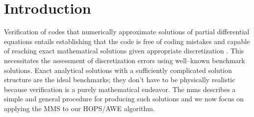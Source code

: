 \section{Introduction}
\label{intro:chapter 5 introduction}

Verification of codes that numerically approximate solutions of partial differential equations entails establishing that the code is free of coding mistakes and capable of reaching exact mathematical solutions given appropriate discretization \cite{roache2019method,salari2000code}. This necessitates the assessment of discretization errors using well--known benchmark solutions. Exact analytical solutions with a sufficiently complicated solution structure are the ideal benchmarks; they don't have to be physically realistic because verification is a purely mathematical endeavor. The \gls{mms} describes a simple and general procedure for producing such solutions and we now focus on applying the MMS to our HOPS/AWE algorithm. 